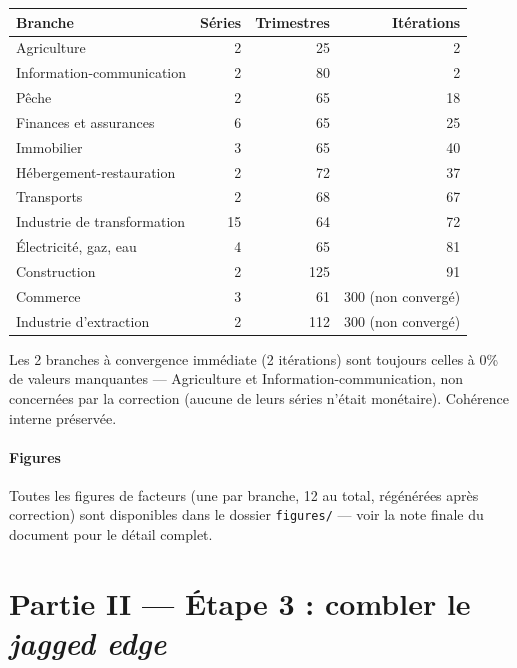 \documentclass[11pt,a4paper]{article}
\begin{document}
\begin{center}
\small
\begin{tabular}{lrrr}
\toprule
\textbf{Branche} & \textbf{Séries} & \textbf{Trimestres} & \textbf{Itérations} \\
\midrule
Agriculture & 2 & 25 & 2 \\
Information-communication & 2 & 80 & 2 \\
Pêche & 2 & 65 & 18 \\
Finances et assurances & 6 & 65 & 25 \\
Immobilier & 3 & 65 & 40 \\
Hébergement-restauration & 2 & 72 & 37 \\
Transports & 2 & 68 & 67 \\
Industrie de transformation & 15 & 64 & 72 \\
Électricité, gaz, eau & 4 & 65 & 81 \\
Construction & 2 & 125 & 91 \\
Commerce & 3 & 61 & 300 (non convergé) \\
Industrie d'extraction & 2 & 112 & 300 (non convergé) \\
\bottomrule
\end{tabular}
\end{center}

\begin{intuition}
Les 2 branches à convergence immédiate (2 itérations) sont toujours celles à 0\% de valeurs manquantes --- Agriculture et Information-communication, non concernées par la correction (aucune de leurs séries n'était monétaire). Cohérence interne préservée.
\end{intuition}

\subsection{Figures}

Toutes les figures de facteurs (une par branche, 12 au total, régénérées après correction) sont disponibles dans le dossier \texttt{figures/} --- voir la note finale du document pour le détail complet.

\part*{Partie II --- Étape 3 : combler le \emph{jagged edge}}
\end{document}
